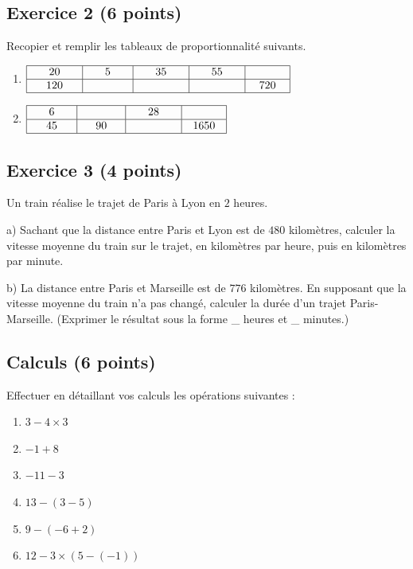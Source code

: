 \documentclass[14 pt]{extarticle}
\theoremstyle{plain}
\begin{document}
\subsection*{Exercice 2 (6 points)}

Recopier et remplir les tableaux de proportionnalité suivants. 

\begin{enumerate}
\item $\renewcommand{\arraystretch}{1}
\begin{array}{|c|c|c|c|c|}
\hline
\phantom{000}20 \phantom{000} &\phantom{000}5\phantom{000} &  \phantom{000}35\phantom{000} &   \phantom{000}55\phantom{000} & \phantom{000} \phantom{000} \\
\hline
120 & \phantom{700} & &   & 720 \\
\hline
\end{array}
\renewcommand{\arraystretch}{1}$

\item $\renewcommand{\arraystretch}{1}
\begin{array}{|c|c|c|c|c|}
\hline
\phantom{000}6\phantom{000}   & \phantom{000} \ \phantom{000} & \phantom{000}28\phantom{000}& \phantom{000}\phantom{000}   \\
\hline
45 &  90& &1650\\
\hline
\end{array}
\renewcommand{\arraystretch}{1}$
\end{enumerate}

\subsection*{Exercice 3 (4 points)}

Un train réalise le trajet de Paris à Lyon en $2$ heures. 

a) Sachant que la distance entre Paris et Lyon est de $480$ 
kilomètres, calculer la vitesse moyenne du train sur le trajet, en kilomètres par heure, puis en kilomètres par minute. 

b) La distance entre Paris et Marseille est de $776$ kilomètres. En 
supposant que la vitesse moyenne du train n'a pas changé, calculer la durée d'un trajet Paris-Marseille. (Exprimer le résultat sous la forme \_ heures et \_ minutes.)

 
 \newpage
 
 
 \subsection*{Calculs (6 points)}
 Effectuer en détaillant vos calculs les opérations suivantes : 
 \begin{enumerate}
 \item $3 - 4 \times 3$
 \item $-1 + 8$
 \item $ - 11 -3$
 \item $13- (3-5)$
 \item $9 - ( - 6 +2)$
 \item $12 - 3 \times (5 - (-1))$
 \end{enumerate}
\end{document}
